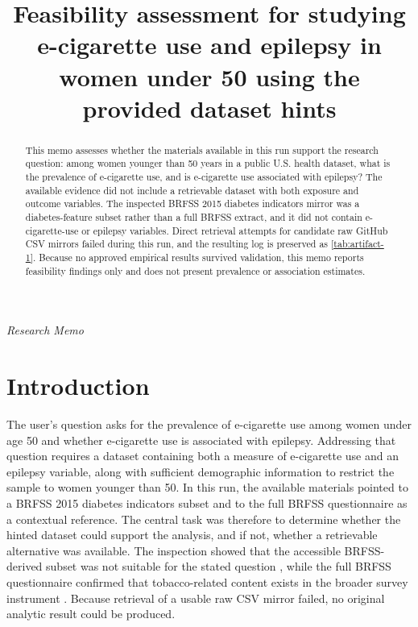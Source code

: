 \documentclass[11pt]{article}
\title{Feasibility assessment for studying e-cigarette use and epilepsy in women under 50 using the provided dataset hints}
\author{}
\date{}
\begin{document}
\maketitle

\begin{center}\small\textit{Research Memo}\end{center}

\begin{abstract}

This memo assesses whether the materials available in this run support the research question: among women younger than 50 years in a public U.S. health dataset, what is the prevalence of e-cigarette use, and is e-cigarette use associated with epilepsy? The available evidence did not include a retrievable dataset with both exposure and outcome variables. The inspected BRFSS 2015 diabetes indicators mirror was a diabetes-feature subset rather than a full BRFSS extract, and it did not contain e-cigarette-use or epilepsy variables. Direct retrieval attempts for candidate raw GitHub CSV mirrors failed during this run, and the resulting log is preserved as \ref{tab:artifact-1}. Because no approved empirical results survived validation, this memo reports feasibility findings only and does not present prevalence or association estimates.

\end{abstract}

\section{Introduction}
The user’s question asks for the prevalence of e-cigarette use among women under age 50 and whether e-cigarette use is associated with epilepsy. Addressing that question requires a dataset containing both a measure of e-cigarette use and an epilepsy variable, along with sufficient demographic information to restrict the sample to women younger than 50. In this run, the available materials pointed to a BRFSS 2015 diabetes indicators subset and to the full BRFSS questionnaire as a contextual reference. The central task was therefore to determine whether the hinted dataset could support the analysis, and if not, whether a retrievable alternative was available. The inspection showed that the accessible BRFSS-derived subset was not suitable for the stated question \cite{ref1}, while the full BRFSS questionnaire confirmed that tobacco-related content exists in the broader survey instrument \cite{ref2}. Because retrieval of a usable raw CSV mirror failed, no original analytic result could be produced.
\end{document}
